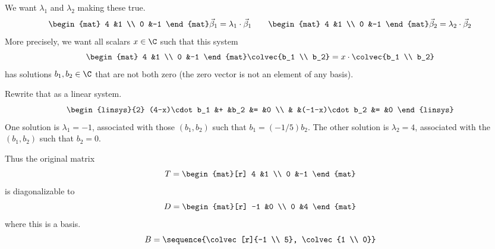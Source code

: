 \begin{frame}
We want $\lambda_1$ and $\lambda_2$ making these true.
\begin{equation*}
  \begin{mat}
    4  &1  \\
    0  &-1    
  \end{mat}
  \vec{\beta}_1
  =\lambda_1\cdot\vec{\beta}_1
  \qquad
  \begin{mat}
    4  &1  \\
    0  &-1    
  \end{mat}
  \vec{\beta}_2
  =\lambda_2\cdot\vec{\beta}_2
\end{equation*}
More precisely, 
we want all scalars $x\in\C$ such that this system
\begin{equation*}
  \begin{mat}
    4  &1  \\
    0  &-1    
  \end{mat}
  \colvec{b_1 \\ b_2}
  =x\cdot\colvec{b_1 \\ b_2}
\end{equation*}
has solutions $b_1,b_2\in\C$ that are not both zero
(the zero vector is not an element of any basis).

\pause
Rewrite that as a linear system.
\begin{equation*}
  \begin{linsys}{2}
    (4-x)\cdot b_1 &+ &b_2             &= &0 \\
                   &  &(-1-x)\cdot b_2 &= &0 
  \end{linsys}
\end{equation*}
One solution is $\lambda_1=-1$, associated with those
$(b_1,b_2)$ such that $b_1=(-1/5)b_2$.
The other solution is $\lambda_2=4$, associated with the
$(b_1,b_2)$ such that
$b_2=0$.
\end{frame}
\begin{frame}
Thus the original matrix  
\begin{equation*}
  T=
  \begin{mat}[r]
    4  &1  \\
    0  &-1
  \end{mat}
\end{equation*}
is diagonalizable to
\begin{equation*}
  D=
  \begin{mat}[r]
    -1  &0  \\
    0  &4
  \end{mat}
\end{equation*}
where this is a basis.
\begin{equation*}
  B=\sequence{\colvec[r]{-1 \\ 5},
              \colvec{1 \\ 0}}
\end{equation*}
\end{frame}




